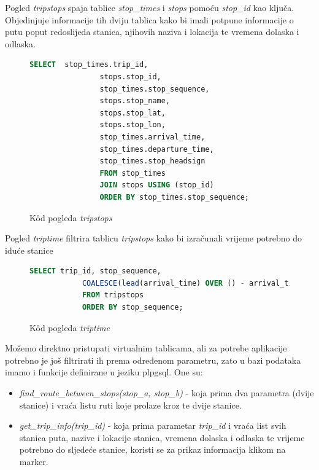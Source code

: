 \documentclass[zavrsnirad]{fer}
\begin{document}
Pogled \textit{tripstops} spaja tablice \textit{stop\_times} i \textit{stops} pomoću \textit{stop\_id} kao ključa. Objedinjuje informacije tih dviju tablica kako bi imali potpune informacije o putu poput redoslijeda stanica, njihovih naziva i lokacija te vremena dolaska i odlaska.
\begin{figure}[h]
	\centering
	\begin{minipage}{0.8\linewidth}
		\begin{lstlisting}[language=SQL]
 		SELECT  stop_times.trip_id,
				stops.stop_id,
				stop_times.stop_sequence,
				stops.stop_name,
				stops.stop_lat,
				stops.stop_lon,
				stop_times.arrival_time,
				stop_times.departure_time,
				stop_times.stop_headsign
				FROM stop_times
				JOIN stops USING (stop_id)
				ORDER BY stop_times.stop_sequence;
		\end{lstlisting}
	\end{minipage}
	\caption{K\^od pogleda \textit{tripstops}}
	\label{slk:tripstops}
\end{figure}

Pogled \textit{triptime} filtrira tablicu \textit{tripstops} kako bi izračunali vrijeme potrebno do iduće stanice
\begin{figure}[h]
	\centering
	\begin{minipage}{0.8\linewidth}
		\begin{lstlisting}[language=SQL]
			SELECT trip_id, stop_sequence,
			COALESCE(lead(arrival_time) OVER () - arrival_time, '00:00:00'::interval) AS time_till_next_stop
			FROM tripstops
			ORDER BY stop_sequence;
		\end{lstlisting}
	\end{minipage}
	\caption{K\^od pogleda \textit{triptime}}
	\label{slk:triptime}
\end{figure}

Možemo direktno pristupati virtualnim tablicama, ali za potrebe aplikacije potrebno je još filtrirati ih prema određenom parametru, zato u bazi podataka imamo i funkcije definirane u jeziku plpgsql.
One su: 
\begin{itemize}
	\item \textit{find\_route\_between\_stops(stop\_a, stop\_b)} - koja prima dva parametra (dvije stanice) i vraća listu ruti koje prolaze kroz te dvije stanice.
	\item \textit{get\_trip\_info(trip\_id)} - koja prima parametar \textit{trip\_id} i vraća list svih stanica puta, nazive i lokacije stanica, vremena dolaska i odlaska te vrijeme potrebno do sljedeće stanice, koristi se za prikaz informacija klikom na marker.
\end{itemize}
\end{document}
